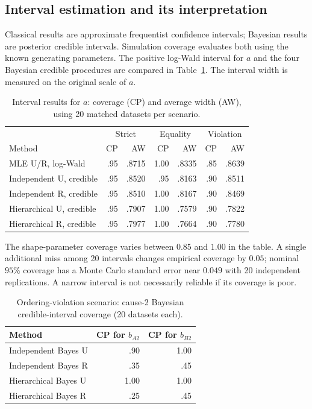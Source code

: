 \documentclass[a4paper,11pt]{article}
\begin{document}
\subsection{Interval estimation and its interpretation}
Classical results are approximate frequentist confidence intervals; Bayesian results are posterior
credible intervals. Simulation coverage evaluates both using the known generating parameters.
The positive log-Wald interval for $a$ and the four Bayesian credible procedures are compared
in Table~\ref{tab:shape-intervals}. The interval width is measured on the original scale of $a$.

\begin{table}[htbp]\centering\small
\caption{Interval results for $a$: coverage (CP) and average width (AW), using 20 matched datasets per scenario.}\label{tab:shape-intervals}
\begin{tabular}{lrrrrrr}\toprule
&\multicolumn{2}{c}{Strict} &\multicolumn{2}{c}{Equality} &\multicolumn{2}{c}{Violation}\\
Method & CP & AW & CP & AW & CP & AW\\\midrule
MLE U/R, log-Wald &.95&.8715&1.00&.8335&.85&.8639\\
Independent U, credible &.95&.8520&.95&.8163&.90&.8511\\
Independent R, credible &.95&.8510&1.00&.8167&.90&.8469\\
Hierarchical U, credible &.95&.7907&1.00&.7579&.90&.7822\\
Hierarchical R, credible &.95&.7977&1.00&.7664&.90&.7780\\\bottomrule
\end{tabular}
\end{table}

The shape-parameter coverage varies between $0.85$ and $1.00$ in the table. A single additional
miss among 20 intervals changes empirical coverage by $0.05$; nominal $95\%$ coverage
has a Monte Carlo standard error near $0.049$ with 20 independent replications.
A narrow interval is not necessarily reliable if its coverage is poor.

\begin{table}[htbp]\centering\small
\caption{Ordering-violation scenario: cause-2 Bayesian credible-interval coverage (20 datasets each).}\label{tab:violation-coverage}
\begin{tabular}{lrr}\toprule
Method & CP for $b_{A2}$ & CP for $b_{B2}$\\\midrule
Independent Bayes U & .90 & 1.00\\
Independent Bayes R & .35 & .45\\
Hierarchical Bayes U & 1.00 & 1.00\\
Hierarchical Bayes R & .25 & .45\\\bottomrule
\end{tabular}
\end{table}
\end{document}
